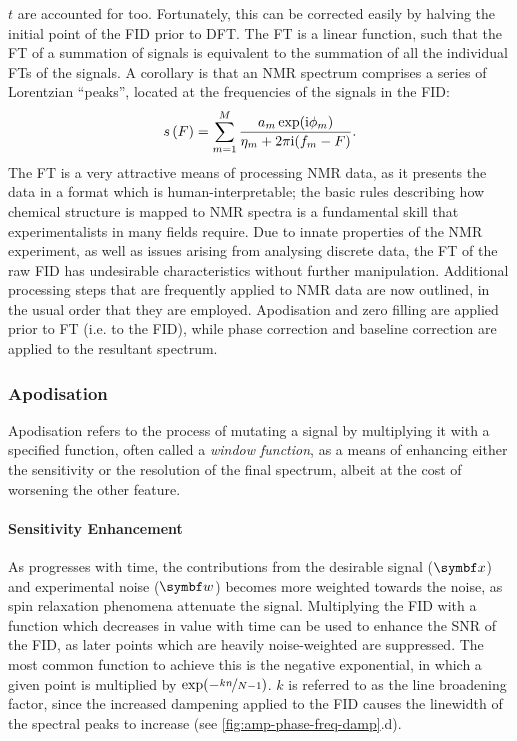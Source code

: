 $t$ are accounted for too. Fortunately, this can be corrected easily by
halving the initial point of the \ac{FID} prior to \ac{DFT}\cite{Tang1994}.
The \ac{FT} is a linear function, such that the
\ac{FT} of a summation of signals is equivalent to the summation of all
the individual \ac{FT}s of the signals. A corollary is that an \ac{NMR}
spectrum comprises a series of Lorentzian ``peaks'', located at the frequencies
of the signals in the \ac{FID}:
\begin{equation}
    s\left(F\right) = \sum_{m=1}^{M}
    \frac{\amexpphim}
    {\eta_m + 2 \pi \iu (f_m - F)}.
    \label{eq:ft-summation}%
\end{equation}
The \ac{FT} is a very attractive means of processing \ac{NMR} data, as it
presents the data in a format which is human-interpretable; the basic
rules describing how chemical structure is mapped to \ac{NMR} spectra
is a fundamental skill that experimentalists in many fields
require\cite{Hore2015b}.
Due to innate properties of the \ac{NMR} experiment,
as well as issues arising from analysing discrete data, the \ac{FT} of
the raw \ac{FID} has undesirable
characteristics without further manipulation. Additional processing
steps that are frequently applied to \ac{NMR} data are now outlined, in the
usual order that they are employed. Apodisation and zero filling
are applied prior to \ac{FT} (i.e. to the \ac{FID}), while phase
correction and baseline correction are applied to the resultant spectrum.

\subsubsection{Apodisation}
Apodisation refers to the process of mutating a signal by multiplying it with a
specified function, often called a \emph{window function}\cite[Section
3.2.7]{Claridge2016}, as a means of enhancing either the sensitivity or the
resolution of the final spectrum, albeit at the cost of worsening the other
feature.

\paragraph{Sensitivity Enhancement} As  progresses with time, the
contributions from the desirable signal ($\bx$) and experimental noise ($\bw$)
becomes more weighted towards the noise, as spin relaxation phenomena attenuate
the signal.  Multiplying the \ac{FID} with a function which decreases in value
with time can be used to enhance the \ac{SNR} of the \ac{FID}, as later points
which are heavily noise-weighted are suppressed. The most common function to
achieve this is the negative exponential, in which a given point is multiplied
by $\exp(-\nicefrac{k n}{N - 1})$.  $k$ is referred to as the line broadening
factor, since the increased dampening applied to the \ac{FID} causes the
linewidth of the spectral peaks to increase (see
\cref{fig:amp-phase-freq-damp}.d).

